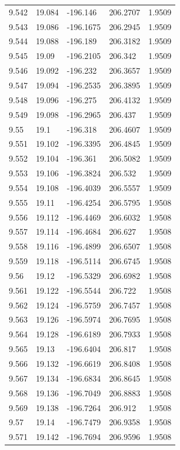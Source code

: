 \begin{tabular}{lllll}
9.542 & 19.084 & -196.146 & 206.2707 & 1.9509 \\
9.543 & 19.086 & -196.1675 & 206.2945 & 1.9509 \\
9.544 & 19.088 & -196.189 & 206.3182 & 1.9509 \\
9.545 & 19.09 & -196.2105 & 206.342 & 1.9509 \\
9.546 & 19.092 & -196.232 & 206.3657 & 1.9509 \\
9.547 & 19.094 & -196.2535 & 206.3895 & 1.9509 \\
9.548 & 19.096 & -196.275 & 206.4132 & 1.9509 \\
9.549 & 19.098 & -196.2965 & 206.437 & 1.9509 \\
9.55 & 19.1 & -196.318 & 206.4607 & 1.9509 \\
9.551 & 19.102 & -196.3395 & 206.4845 & 1.9509 \\
9.552 & 19.104 & -196.361 & 206.5082 & 1.9509 \\
9.553 & 19.106 & -196.3824 & 206.532 & 1.9509 \\
9.554 & 19.108 & -196.4039 & 206.5557 & 1.9509 \\
9.555 & 19.11 & -196.4254 & 206.5795 & 1.9508 \\
9.556 & 19.112 & -196.4469 & 206.6032 & 1.9508 \\
9.557 & 19.114 & -196.4684 & 206.627 & 1.9508 \\
9.558 & 19.116 & -196.4899 & 206.6507 & 1.9508 \\
9.559 & 19.118 & -196.5114 & 206.6745 & 1.9508 \\
9.56 & 19.12 & -196.5329 & 206.6982 & 1.9508 \\
9.561 & 19.122 & -196.5544 & 206.722 & 1.9508 \\
9.562 & 19.124 & -196.5759 & 206.7457 & 1.9508 \\
9.563 & 19.126 & -196.5974 & 206.7695 & 1.9508 \\
9.564 & 19.128 & -196.6189 & 206.7933 & 1.9508 \\
9.565 & 19.13 & -196.6404 & 206.817 & 1.9508 \\
9.566 & 19.132 & -196.6619 & 206.8408 & 1.9508 \\
9.567 & 19.134 & -196.6834 & 206.8645 & 1.9508 \\
9.568 & 19.136 & -196.7049 & 206.8883 & 1.9508 \\
9.569 & 19.138 & -196.7264 & 206.912 & 1.9508 \\
9.57 & 19.14 & -196.7479 & 206.9358 & 1.9508 \\
9.571 & 19.142 & -196.7694 & 206.9596 & 1.9508 \\

\end{tabular}
